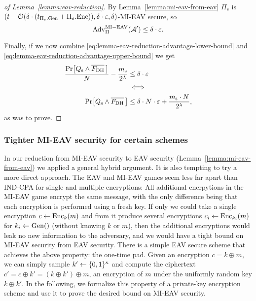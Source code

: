 \begin{proof}[of Lemma~\ref{lemma:eav-reduction}]
	By Lemma~\ref{lemma:mi-eav-from-eav} $\Pi_s$ is $(t - \mathcal{O}(\delta \cdot (t_{\Pi_s.\mathrm{Gen}} + \Pi_s.\mathrm{Enc})), \delta \cdot \varepsilon, \delta)$-MI-EAV secure, so
	\begin{equation} \label{eq:lemma-eav-reduction-advantage-upper-bound}
		\mathrm{Adv}_{\Pi}^{\mathrm{MI-EAV}}(\mathcal{A}') \le \delta \cdot \varepsilon.
	\end{equation}

	Finally, if we now combine \eqref{eq:lemma-eav-reduction-advantage-lower-bound} and \eqref{eq:lemma-eav-reduction-advantage-upper-bound} we get
	\begin{align*}
		\frac{\pr{\qs \land \overline{\fdh}\,}}{N} - \frac{\ms}{2^\lambda} & \le \delta \cdot \epsilon                                          \\
		                                                                   & \iff                                                               \\
		\pr{\qs \land \overline{\fdh}\,}                                   & \le \delta \cdot N \cdot \epsilon + \frac{\ms \cdot N}{2^\lambda},
	\end{align*}
	as was to prove.
\end{proof}

\subsubsection{Tighter MI-EAV security for certain schemes}

In our reduction from MI-EAV security to EAV security (Lemma~\ref{lemma:mi-eav-from-eav}) we applied a general hybrid argument. It is also tempting to try a more direct approach. The EAV and MI-EAV games seem less far apart than IND-CPA for single and multiple encryptions: All additional encrpytions in the MI-EAV game encrypt the same message, with the only difference being that each encryption is performed using a fresh key. If only we could take a single encryption $c \leftarrow \mathrm{Enc}_k(m)$ and from it produce several encryptions $c_i \leftarrow \mathrm{Enc}_{k_i}(m)$ for $k_i \leftarrow \mathrm{Gen}()$ (without knowing $k$ or $m$), then the additional encryptions would leak no new information to the adversary, and we would have a tight bound on MI-EAV security from EAV security. There is a simple EAV secure scheme that achieves the above property: the one-time pad. Given an encryption $c = k \oplus m$, we can simply sample $k' \leftarrow \{0, 1\}^\kappa$ and compute the ciphertext $c' = c \oplus k' = (k \oplus k') \oplus m$, an encryption of $m$ under the uniformly random key $k \oplus k'$. In the following, we formalize this property of a private-key encryption scheme and use it to prove the desired bound on MI-EAV security.

